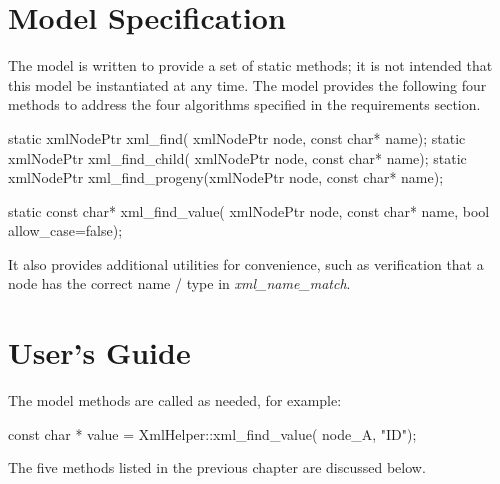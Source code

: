 \documentclass[11pt,fleqn]{report}
\begin{document}
\chapter {Model Specification}
The model is written to provide a set of static methods; it is not intended
that this model be instantiated at any time.
The model provides the following four methods to address the four algorithms
specified in the requirements section.
\begin{codeC}
  static xmlNodePtr xml_find(        xmlNodePtr node, const char* name);
  static xmlNodePtr xml_find_child(  xmlNodePtr node, const char* name);
  static xmlNodePtr xml_find_progeny(xmlNodePtr node, const char* name);

  static const char* xml_find_value( xmlNodePtr node,
                                     const char* name,
                                     bool allow_case=false);
\end{codeC}
It also provides additional utilities for convenience, such as verification
that a node has the correct name / type in \textit{xml\_name\_match}.


\chapter {User's Guide}
The model methods are called as needed, for example:
\begin{codeC}
const char * value = XmlHelper::xml_find_value( node_A, "ID");
\end{codeC}

The five methods listed in the previous chapter are discussed below.
\end{document}
